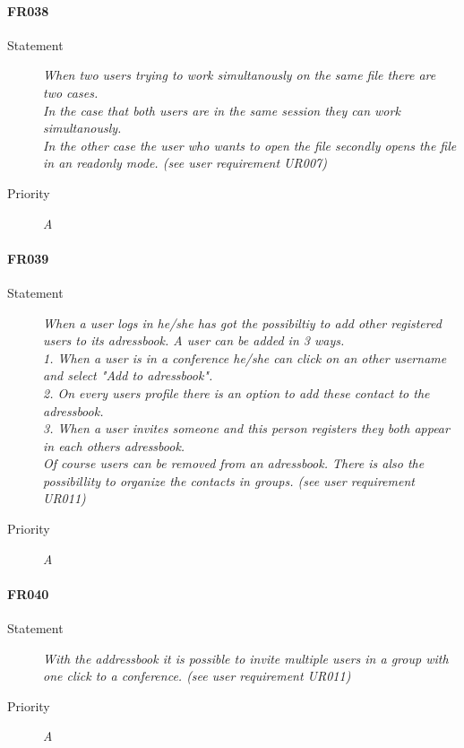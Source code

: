 \paragraph{FR038}
\begin{description}
  \item[Statement]
    \textit{When two users trying to work simultanously on the same file there are two cases. \\In the case that both users are in the same session they can work simultanously. \\In the other case the user who wants to open the file secondly opens the file in an readonly mode. (see user requirement UR007)}
  \item[Priority]
    \textit{A}
\end{description}

\paragraph{FR039}
\begin{description}
  \item[Statement]
    \textit{When a user logs in he/she has got the possibiltiy to add
      other registered users to its adressbook. A user can be added in
      3 ways.\\1. When a user is in a conference he/she can click on
      an other username and select "Add to adressbook".\\2. On every
      users profile there is an option to add these contact to the
      adressbook.\\3. When a user invites someone and this person registers they both appear in each others adressbook.\\Of course users can be removed from an adressbook. There is also the possibillity to organize the contacts in groups. (see user requirement UR011)}
  \item[Priority]
    \textit{A}
\end{description}

\paragraph{FR040}
\begin{description}
  \item[Statement]
    \textit{With the addressbook it is possible to invite multiple users in a group with one click to a conference. (see user requirement UR011)}
  \item[Priority]
    \textit{A}
\end{description}


